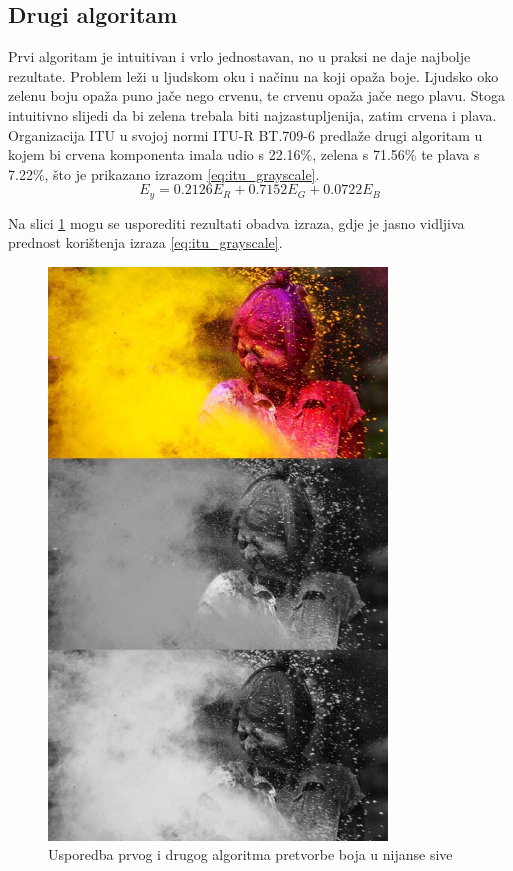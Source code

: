 \documentclass[times, utf8, zavrsni, numeric]{fer}
\begin{document}
\subsection{Drugi algoritam}

Prvi algoritam je intuitivan i vrlo jednostavan, no u praksi ne daje najbolje rezultate. Problem leži u ljudskom oku i načinu na koji opaža boje. Ljudsko oko zelenu boju opaža puno jače nego crvenu, te crvenu opaža jače nego plavu. Stoga intuitivno slijedi da bi zelena trebala biti najzastupljenija, zatim crvena i plava. Organizacija ITU  u svojoj normi ITU-R BT.709-6 \citep{ITUgrayscale} predlaže drugi algoritam u kojem bi crvena komponenta imala udio s 22.16\%, zelena s 71.56\% te plava s 7.22\%, što je prikazano izrazom \eqref{eq:itu_grayscale}.
\begin{equation} \label{eq:itu_grayscale}
E_y = 0.2126E_R + 0.7152E_G + 0.0722E_B
\end{equation}

Na slici \ref{fig:grayscale_example_all} mogu se usporediti rezultati obadva izraza, gdje je jasno vidljiva prednost korištenja izraza \eqref{eq:itu_grayscale}.

\begin{figure}[htb]
    \centering
    \includegraphics[width=9cm]{images/grayscale_example_all.jpg}
    \caption{Usporedba prvog i drugog algoritma pretvorbe boja u nijanse sive}
    \label{fig:grayscale_example_all}
\end{figure}
\end{document}
